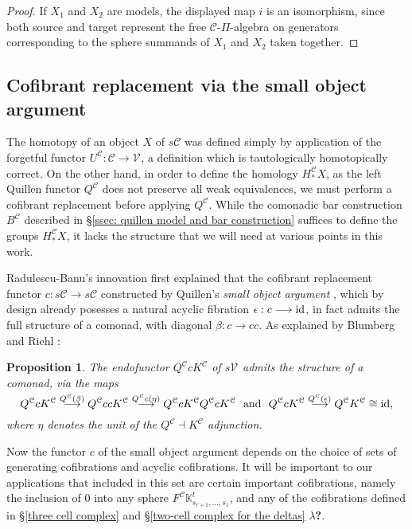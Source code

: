 \documentclass[11pt]{amsart}
\theoremstyle{plain}
\newtheorem{prop}[thm]{Proposition}
\theoremstyle{definition}
\renewcommand{\to}{\longrightarrow}
\newcommand{\calV}{\mathcal{V}}
\newcommand{\calc}{\mathcal{C}}
\theoremstyle{plain}
\newcommand{\vect}[2]{\calV^{#1}_{#2}}
\newcommand{\Id}{\textup{id}}
\begin{document}
\begin{CPiAlgs and CHalgs}
\begin{proof}
If $X_1$ and $X_2$ are models, the displayed map $i$ is an isomorphism, since both source and target represent the free $\calc$-$\Pi$-algebra on generators corresponding to the sphere summands of $X_1$ and $X_2$ taken together. 
\end{proof}

\subsection{Cofibrant replacement via the small object argument}\label{Cofibrant replacement via the small object argument}
The homotopy of an object $X$ of $s\calc$ was defined simply by application of the forgetful functor $U^{\calc}:\calc\to\vect{}{}$, a definition which is tautologically homotopically correct. On the other hand, in order to define the homology $H_*^{\calc}X$, as the left Quillen functor $Q^{\calc}$ does not preserve all weak equivalences, we must perform a cofibrant replacement before applying $Q^{\calc}$. While the comonadic bar construction $B^{\calc}$ described in \S\ref{ssec: quillen model and bar construction} suffices to define the groups $H_*^{\calc}X$, it lacks the structure that we will need at various points in this work.

Radulescu-Banu's innovation \cite{Radulescu-Banu.pdf} first explained that the cofibrant replacement functor $c:s\calc\to s\calc$ constructed by Quillen's \emph{small object argument}  \cite{QuillenHomAlg.pdf}, which by design already posesses a natural acyclic fibration $\epsilon:c\to\Id$, in fact admits the full structure of a comonad, with diagonal $\beta:c\to cc$. As explained by Blumberg and Riehl \cite[Remark 4.12]{BlumRiehlResolutions.pdf}:
\begin{prop}\label{QcK is a comonad}
The endofunctor $Q^\calc cK^\calc$ of $s\vect{}{}$ admits the structure of a comonad, via the maps
\[Q^\calc cK^\calc\overset{\smash{Q^\calc (\beta)}}{\to}Q^\calc ccK^\calc \overset{\smash{Q^\calc c(\eta)}}{\to} Q^\calc cK^\calc Q^\calc cK^\calc\text{ \ and \ }Q^\calc cK^\calc\overset{\smash{Q^\calc (\epsilon)}}{\to}Q^\calc K^\calc\cong\Id,\]
where $\eta$ denotes the unit of the $Q^\calc\dashv K^\calc$ adjunction.
\end{prop}

Now the functor $c$ of the small object argument depends on the choice of sets of generating cofibrations and acyclic cofibrations. It will be important to our applications that included in this set are certain important cofibrations, namely the inclusion of $0$ into any sphere $F^\calc\mathbb{K}^t_{s_{r+1},\ldots,s_1}$, and any of the cofibrations  defined in \S\ref{three cell complex} and \S\ref{two-cell complex for the deltas} \textbf{$\lambda$?}.


\end{CPiAlgs and CHalgs}
\end{document}

